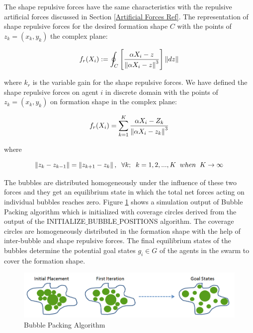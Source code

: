 The shape repulsive forces have the same characteristics with the repulsive artificial forces discussed in Section \ref{Artificial Forces Ref}. The representation of shape repulsive forces for the desired formation shape $C$ with the points of  $z_k = (x_k,y_k)$ the complex plane:
	
\begin{equation} \label{buble_repulsive}
f_r(X_i) := \oint_C \left[\frac{\alpha X_i - z}{\left\lVert\alpha X_i - z\right\rVert^3}\right] \left\lVert dz\right\rVert
\end{equation}

where $k_r$ is the variable gain for the shape repulsive forces. We have defined the shape repulsive forces on agent $i$ in discrete domain with the points of  $z_k = (x_k,y_k)$ on formation shape in the complex plane:

\begin{equation}
f_r(X_i) = \sum_{k=1}^{K} \frac{\alpha X_i - Z_k}{\left\lVert\alpha X_i - z_k\right\rVert^3}
\end{equation}
				
where

\begin{equation}
\left\lVert z_k - z_{k-1}\right\rVert = \left\lVert z_{k+1} - z_k\right\rVert, \hspace{0.2cm}  \forall k ;  \hspace{0.2cm} k=1,2,...,K \hspace{0.2cm} when  \hspace{0.2cm} K \to\infty					
\end{equation}
						

	
The bubbles are distributed homogeneously under the influence of these two forces and they get an equilibrium state in which the total net forces acting on individual bubbles reaches zero. Figure \ref{buble_ornek} shows a simulation output of Bubble Packing algorithm which is initialized with coverage circles derived from the output of the INITIALIZE$\_$BUBBLE$\_$POSITIONS algorithm. The coverage circles are homogeneously distributed in the formation shape with the help of inter-bubble and shape repulsive forces. The final equilibrium states of the bubbles determine the potential goal states $g_i \in G$  of the agents in the swarm to cover the formation shape.

\begin{figure}[H]
\caption{Bubble Packing Algorithm} \label{buble_ornek}
\centering
\includegraphics[scale = 0.50]{bubble_packing2}
\end{figure}

